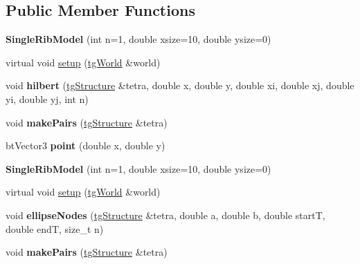 \subsection*{Public Member Functions}
\begin{DoxyCompactItemize}
\item 
\hypertarget{class_single_rib_model_ad5518d88b58a7ffbd1995874bd0c03c8}{{\bfseries Single\-Rib\-Model} (int n=1, double xsize=10, double ysize=0)}\label{class_single_rib_model_ad5518d88b58a7ffbd1995874bd0c03c8}

\item 
virtual void \hyperlink{class_single_rib_model_a124840540b52ec55d3e0a562f5bf8038}{setup} (\hyperlink{classtg_world}{tg\-World} \&world)
\item 
\hypertarget{class_single_rib_model_a0f2082063c13e02d9f585d38a4a57850}{void {\bfseries hilbert} (\hyperlink{classtg_structure}{tg\-Structure} \&tetra, double x, double y, double xi, double xj, double yi, double yj, int n)}\label{class_single_rib_model_a0f2082063c13e02d9f585d38a4a57850}

\item 
\hypertarget{class_single_rib_model_a64ba236ccfef15572fcd70a273f083e4}{void {\bfseries make\-Pairs} (\hyperlink{classtg_structure}{tg\-Structure} \&tetra)}\label{class_single_rib_model_a64ba236ccfef15572fcd70a273f083e4}

\item 
\hypertarget{class_single_rib_model_a696117bd0ca8f3481d8168da8c60f7ad}{bt\-Vector3 {\bfseries point} (double x, double y)}\label{class_single_rib_model_a696117bd0ca8f3481d8168da8c60f7ad}

\item 
\hypertarget{class_single_rib_model_ad5518d88b58a7ffbd1995874bd0c03c8}{{\bfseries Single\-Rib\-Model} (int n=1, double xsize=10, double ysize=0)}\label{class_single_rib_model_ad5518d88b58a7ffbd1995874bd0c03c8}

\item 
virtual void \hyperlink{class_single_rib_model_a124840540b52ec55d3e0a562f5bf8038}{setup} (\hyperlink{classtg_world}{tg\-World} \&world)
\item 
\hypertarget{class_single_rib_model_aae23ce54b57b14daedadac4fa51f1c2e}{void {\bfseries ellipse\-Nodes} (\hyperlink{classtg_structure}{tg\-Structure} \&tetra, double a, double b, double start\-T, double end\-T, size\-\_\-t n)}\label{class_single_rib_model_aae23ce54b57b14daedadac4fa51f1c2e}

\item 
\hypertarget{class_single_rib_model_a64ba236ccfef15572fcd70a273f083e4}{void {\bfseries make\-Pairs} (\hyperlink{classtg_structure}{tg\-Structure} \&tetra)}\label{class_single_rib_model_a64ba236ccfef15572fcd70a273f083e4}


\end{DoxyCompactItemize}
